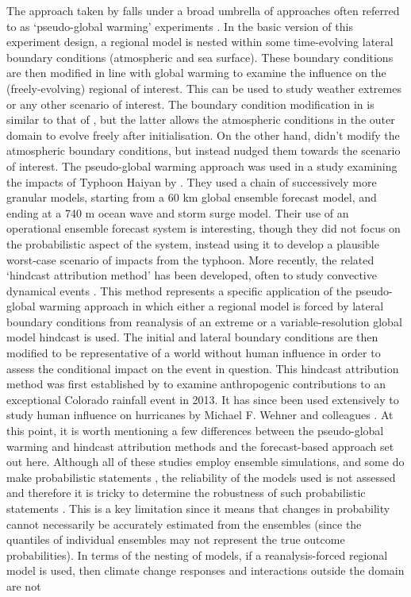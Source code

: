     The approach taken by \citeauthor{meredith_crucial_2015} falls under a broad umbrella of approaches often referred to as `pseudo-global warming' experiments \citep{schar_surrogate_1996}. In the basic version of this experiment design, a regional model is nested within some time-evolving lateral boundary conditions (atmospheric and sea surface). These boundary conditions are then modified in line with global warming to examine the influence on the (freely-evolving) regional of interest. This can be used to study weather extremes or any other scenario of interest. The boundary condition modification in \citeauthor{schar_surrogate_1996} is similar to that of \citeauthor[]{lackmann_hurricane_2015}, but the latter allows the atmospheric conditions in the outer domain to evolve freely after initialisation. On the other hand, \citeauthor[]{meredith_crucial_2015} didn't modify the atmospheric boundary conditions, but instead nudged them towards the scenario of interest. The pseudo-global warming approach was used in a study examining the impacts of Typhoon Haiyan by \citet{takayabu_climate_2015}. They used a chain of successively more granular models, starting from a 60 km global ensemble forecast model, and ending at a 740 m ocean wave and storm surge model. Their use of an operational ensemble forecast system is interesting, though they did not focus on the probabilistic aspect of the system, instead using it to develop a plausible worst-case scenario of impacts from the typhoon. More recently, the related `hindcast attribution method' has been developed, often to study convective dynamical events \citep{wehner_estimating_2019}. This method represents a specific application of the pseudo-global warming approach in which either a regional model is forced by lateral boundary conditions from reanalysis of an extreme or a variable-resolution global model hindcast is used. The initial and lateral boundary conditions are then modified to be representative of a world without human influence in order to assess the conditional impact on the event in question. This hindcast attribution method was first established by \citet{pall_diagnosing_2017} to examine anthropogenic contributions to an exceptional Colorado rainfall event in 2013. It has since been used extensively to study human influence on hurricanes by Michael F. Wehner and colleagues \citep{patricola_anthropogenic_2018,reed_forecasted_2020,reed_attribution_2022}. At this point, it is worth mentioning a few differences between the pseudo-global warming and hindcast attribution methods and the forecast-based approach set out here. Although all of these studies employ ensemble simulations, and some do make probabilistic statements \citep{pall_diagnosing_2017}, the reliability of the models used is not assessed and therefore it is tricky to determine the robustness of such probabilistic statements \citep{bellprat_towards_2019,weisheimer_reliability_2014}. This is a key limitation since it means that changes in probability cannot necessarily be accurately estimated from the ensembles (since the quantiles of individual ensembles may not represent the true outcome probabilities). In terms of the nesting of models, if a reanalysis-forced regional model is used, then climate change responses and interactions outside the domain are not 